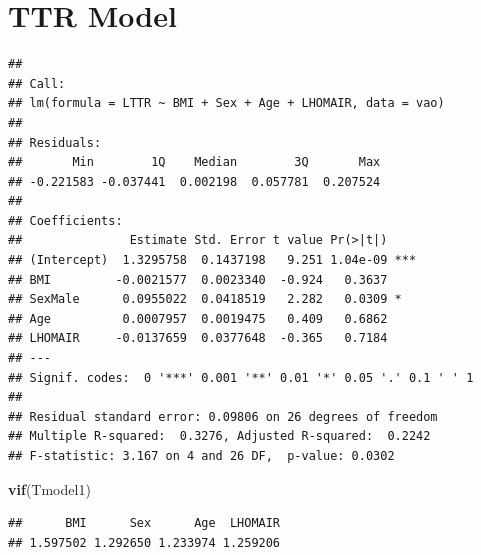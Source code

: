 \documentclass[
]{article}
\newenvironment{Shaded}{\begin{snugshade}}{\end{snugshade}}
\newcommand{\CommentTok}[1]{\textcolor[rgb]{0.56,0.35,0.01}{\textit{#1}}}
\newcommand{\FunctionTok}[1]{\textcolor[rgb]{0.13,0.29,0.53}{\textbf{#1}}}
\newcommand{\NormalTok}[1]{#1}
\newcommand{\OtherTok}[1]{\textcolor[rgb]{0.56,0.35,0.01}{#1}}
\newcommand{\SpecialCharTok}[1]{\textcolor[rgb]{0.81,0.36,0.00}{\textbf{#1}}}
\begin{document}
\newpage

\section{TTR Model}\label{ttr-model}

\begin{Shaded}
\end{Shaded}

\begin{verbatim}
## 
## Call:
## lm(formula = LTTR ~ BMI + Sex + Age + LHOMAIR, data = vao)
## 
## Residuals:
##       Min        1Q    Median        3Q       Max 
## -0.221583 -0.037441  0.002198  0.057781  0.207524 
## 
## Coefficients:
##               Estimate Std. Error t value Pr(>|t|)    
## (Intercept)  1.3295758  0.1437198   9.251 1.04e-09 ***
## BMI         -0.0021577  0.0023340  -0.924   0.3637    
## SexMale      0.0955022  0.0418519   2.282   0.0309 *  
## Age          0.0007957  0.0019475   0.409   0.6862    
## LHOMAIR     -0.0137659  0.0377648  -0.365   0.7184    
## ---
## Signif. codes:  0 '***' 0.001 '**' 0.01 '*' 0.05 '.' 0.1 ' ' 1
## 
## Residual standard error: 0.09806 on 26 degrees of freedom
## Multiple R-squared:  0.3276, Adjusted R-squared:  0.2242 
## F-statistic: 3.167 on 4 and 26 DF,  p-value: 0.0302
\end{verbatim}

\begin{Shaded}
\begin{Highlighting}[]
\FunctionTok{vif}\NormalTok{(Tmodel1)}
\end{Highlighting}
\end{Shaded}

\begin{verbatim}
##      BMI      Sex      Age  LHOMAIR 
## 1.597502 1.292650 1.233974 1.259206
\end{verbatim}
\end{document}
